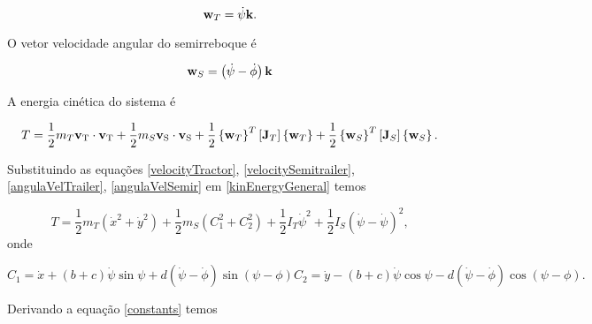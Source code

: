 \documentclass[sublist]{fei}
\begin{document}
\begin{equation} \label{angulaVelTrailer}
    {\bf w}_T = \dot{\psi} {\bf k}.
\end{equation}

O vetor velocidade angular do semirreboque é

\begin{equation} \label{angulaVelSemir}
    {\bf w}_S = \left( \dot{\psi} - \dot{\phi} \right) {\bf k}
\end{equation}

A energia cinética do sistema é

\begin{equation} \label{kinEnergyGeneral}
    T = \frac{1}{2} m_{T} {\bf v}_{\rm T} \cdot {\bf v}_{\rm T} + \frac{1}{2} m_{S} {\bf v}_{\rm S} \cdot {\bf v}_{\rm S} + \frac{1}{2} \left\{ {\bf w}_T \right\}^T \left[ {\bf J}_T \right] \left\{ {\bf w}_T \right\} + \frac{1}{2} \left\{ {\bf w}_S \right\}^T \left[ {\bf J}_S \right] \left\{ {\bf w}_S \right\}.
\end{equation}

Substituindo as equações \eqref{velocityTractor}, \eqref{velocitySemitrailer}, \eqref{angulaVelTrailer}, \eqref{angulaVelSemir} em \eqref{kinEnergyGeneral} temos

\begin{equation} \label{kinEnergyCoord}
    T = \frac{1}{2} m_{T} \left( \dot{x}^2 + \dot{y}^2 \right) + \frac{1}{2} m_{S} \left( C_1^2 + C_2^2 \right) + \frac{1}{2} I_{T} \dot{\psi}^2 + \frac{1}{2} I_{S} \left( \dot{\psi} - \dot{\psi} \right)^2,
\end{equation}
onde

\begin{subequations} \label{constants}
\begin{equation}
    C_1 = \dot{x} + \left( b + c \right) \dot{\psi} \sin \psi + d \left( \dot{\psi} - \dot{\phi} \right) \sin \left( \psi - \phi \right)
\end{equation}
\begin{equation}
    C_2 = \dot{y} - \left( b + c \right) \dot{\psi} \cos \psi - d \left( \dot{\psi} - \dot{\phi} \right) \cos \left( \psi - \phi \right).
\end{equation}
\end{subequations}

Derivando a equação \eqref{constants} temos
\end{document}
